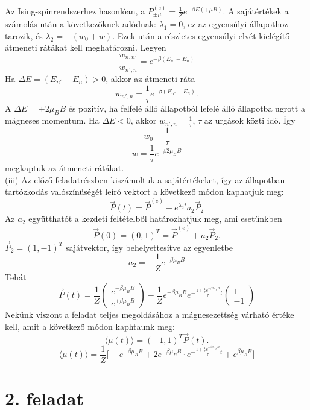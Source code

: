 \documentclass[12pt]{article}
\begin{document}
Az Ising-spinrendszerhez hasonlóan, a  $P^{(e)}_{\pm\mu} = \frac{1}{Z}e^{-\beta E(\mp \mu B)}$. A sajátértékek a számolás után a következőknek adódnak: $\lambda_1 = 0$, ez az egyensúlyi állapothoz tarozik, és $\lambda_2 = -(w_0 + w)$. Ezek után a részletes egyensúlyi elvét kielégítő átmeneti rátákat kell meghatározni. Legyen 
$$\frac{w_{n, n'}}{w_{n', n}} = e^{-\beta(E_{n'}-E_{n})}  $$
Ha $\Delta E = (E_{n'}-E_{n})> 0$, akkor az átmeneti ráta
$$w_{n',n} =\frac{1}{\tau}e^{-\beta(E_{n'}-E_{n})} .$$
A $\Delta E = \pm 2\mu_B B$ és pozitív, ha felfelé álló állapotból lefelé álló állapotba ugrott a mágneses momentum. Ha $\Delta E < 0$, akkor $w_{n',n} = \frac{1}{\tau}$, $\tau$ az urgások közti idő. Így 
$$w_0 = \frac{1}{\tau}$$
$$w= \frac{1}{\tau}e^{-\beta 2 \mu_B B}$$
megkaptuk az átmeneti rátákat.\\
(iii) Az előző feladatrészben kiszámoltuk a sajátértékeket, így az állapotban tartózkodás valószínűségét leíró vektort a következő módon kaphatjuk meg:
$$\vec{P}(t) = \vec{P}^{(e)} + e^{\lambda_2 t} a_2 \vec{P}_2$$
Az $a_2$ együtthatót a kezdeti feltételből határozhatjuk meg, ami esetünkben
$$\vec{P}(0) = (0, 1)^T = \vec{P}^{(e)} + a_2\vec{P}_2.$$
$\vec{P}_2 = (1, -1)^T$ sajátvektor, így behelyettesítve az egyenletbe
$$a_2 = -\frac{1}{Z}e^{-\beta \mu_B B}$$
Tehát
\[
 \vec{P}(t) = \frac{1}{Z}
\begin{pmatrix}
e^{-\beta \mu_B B}\\
e^{+\beta \mu_B B}
\end{pmatrix}
-\frac{1}{Z}e^{-\beta \mu_B B} e^{-\frac{1+\frac{1}{\tau}e^{-\beta 2 \mu_B B}}{\tau}t}
\begin{pmatrix}
1\\
-1
\end{pmatrix}
\]
Nekünk viszont a feladat teljes megoldásához a mágnesezettség várható értéke kell, amit a következő módon kaphtaunk meg:
$$\langle \mu(t)\rangle = (-1, 1)^T \vec{P}(t).$$
$$\langle \mu(t)\rangle = \frac{1}{Z}\Big [ -e^{-\beta \mu_B B}+2e^{-\beta \mu_B B}\cdot  e^{-\frac{1+\frac{1}{\tau}e^{-\beta 2 \mu_B B}}{\tau}t} +e^{\beta \mu_B B} \Big ]$$





\newpage


\section*{2. feladat}
\end{document}
